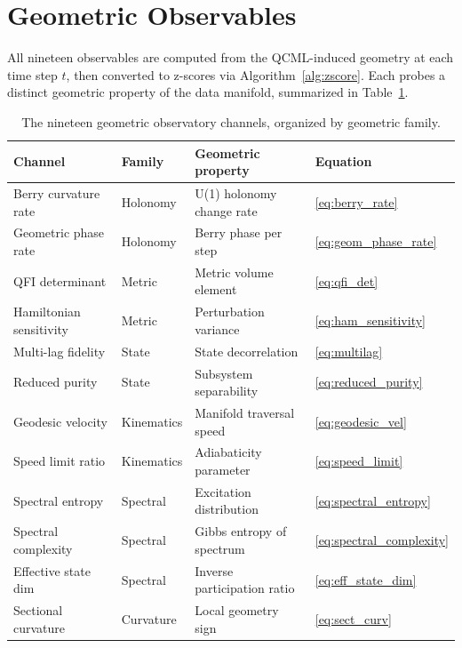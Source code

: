 \documentclass[3p]{elsarticle}
\begin{document}
\section{Geometric Observables}\label{sec:observables}

All nineteen observables are computed from the QCML-induced geometry at
each time step $t$, then converted to z-scores via
Algorithm~\ref{alg:zscore}.  Each probes a distinct geometric property
of the data manifold, summarized in Table~\ref{tab:observatory_channels}.

\begin{table}[htb]
\centering
\caption{The nineteen geometric observatory channels, organized by
  geometric family.}
\label{tab:observatory_channels}
\small
\begin{tabular}{llll}
\toprule
Channel & Family & Geometric property & Equation \\
\midrule
Berry curvature rate & Holonomy & U(1) holonomy change rate & \eqref{eq:berry_rate} \\
Geometric phase rate & Holonomy & Berry phase per step & \eqref{eq:geom_phase_rate} \\
QFI determinant & Metric & Metric volume element & \eqref{eq:qfi_det} \\
Hamiltonian sensitivity & Metric & Perturbation variance & \eqref{eq:ham_sensitivity} \\
Multi-lag fidelity & State & State decorrelation & \eqref{eq:multilag} \\
Reduced purity & State & Subsystem separability & \eqref{eq:reduced_purity} \\
Geodesic velocity & Kinematics & Manifold traversal speed & \eqref{eq:geodesic_vel} \\
Speed limit ratio & Kinematics & Adiabaticity parameter & \eqref{eq:speed_limit} \\
Spectral entropy & Spectral & Excitation distribution & \eqref{eq:spectral_entropy} \\
Spectral complexity & Spectral & Gibbs entropy of spectrum & \eqref{eq:spectral_complexity} \\
Effective state dim & Spectral & Inverse participation ratio & \eqref{eq:eff_state_dim} \\
Sectional curvature & Curvature & Local geometry sign & \eqref{eq:sect_curv} \\

\end{tabular}
\end{table}
\end{document}
